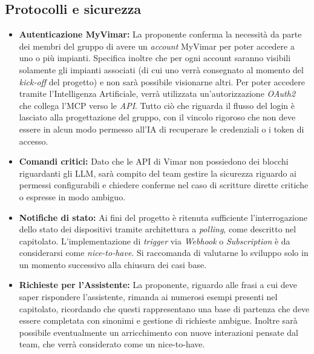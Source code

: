 \documentclass[11pt, a4paper]{article}
\begin{document}
\subsection{ Protocolli e sicurezza}
\begin{itemize}
    \item \textbf{Autenticazione MyVimar:} La proponente conferma la necessità da parte dei membri del gruppo di avere un \textit{account} MyVimar per poter accedere a uno o più impianti. Specifica inoltre che per ogni account saranno visibili solamente gli impianti associati (di cui uno verrà consegnato al momento del \textit{kick-off} del progetto) e non sarà possibile visionarne altri. Per poter accedere tramite l'Intelligenza Artificiale, verrà utilizzata un'autorizzazione \textit{OAuth2} che collega l'MCP verso le \textit{API}. Tutto ciò che riguarda il flusso del login è lasciato alla progettazione del gruppo, con il vincolo rigoroso che non deve essere in alcun modo permesso all'IA di recuperare le credenziali o i token di accesso.
    
    \item \textbf{Comandi critici:} Dato che le API di Vimar non possiedono dei blocchi riguardanti gli LLM, sarà compito del team gestire la sicurezza riguardo ai permessi configurabili e chiedere conferme nel caso di scritture dirette critiche o espresse in modo ambiguo.
    
    \item \textbf{Notifiche di stato:} Ai fini del progetto è ritenuta sufficiente l'interrogazione dello stato dei dispositivi tramite architettura a \textit{polling}, come descritto nel capitolato. L'implementazione di \textit{trigger} via \textit{Webhook} o \textit{Subscription} è da considerarsi come \textit{nice-to-have}. Si raccomanda di valutarne lo sviluppo solo in un momento successivo alla chiusura dei casi base.

    \item \textbf{Richieste per l'Assistente:} La proponente, riguardo alle frasi a cui deve saper rispondere l'assistente, rimanda ai numerosi esempi presenti nel capitolato, ricordando che questi rappresentano una base di partenza che deve essere completata con sinonimi e gestione di richieste ambigue. Inoltre sarà possibile eventualmente un arricchimento con nuove interazioni pensate dal team, che verrà considerato come un nice-to-have.
\end{itemize}
\end{document}
